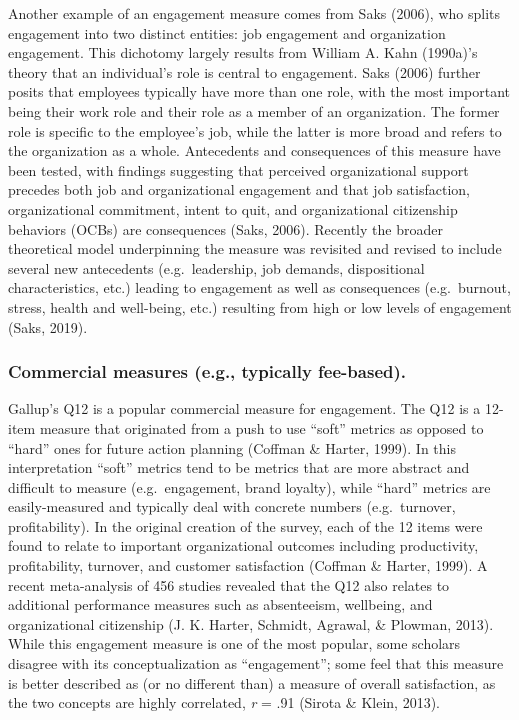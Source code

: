 \documentclass[
  man]{apa6}
\begin{document}
Another example of an engagement measure comes from Saks (2006), who splits engagement into two distinct entities: job engagement and organization engagement. This dichotomy largely results from William A. Kahn (1990a)'s theory that an individual's role is central to engagement. Saks (2006) further posits that employees typically have more than one role, with the most important being their work role and their role as a member of an organization. The former role is specific to the employee's job, while the latter is more broad and refers to the organization as a whole. Antecedents and consequences of this measure have been tested, with findings suggesting that perceived organizational support precedes both job and organizational engagement and that job satisfaction, organizational commitment, intent to quit, and organizational citizenship behaviors (OCBs) are consequences (Saks, 2006). Recently the broader theoretical model underpinning the measure was revisited and revised to include several new antecedents (e.g.~leadership, job demands, dispositional characteristics, etc.) leading to engagement as well as consequences (e.g.~burnout, stress, health and well-being, etc.) resulting from high or low levels of engagement (Saks, 2019).

\hypertarget{commercial-measures-e.g.-typically-fee-based.}{%
\subsubsection{Commercial measures (e.g., typically fee-based).}\label{commercial-measures-e.g.-typically-fee-based.}}

Gallup's Q12 is a popular commercial measure for engagement. The Q12 is a 12-item measure that originated from a push to use ``soft'' metrics as opposed to ``hard'' ones for future action planning (Coffman \& Harter, 1999). In this interpretation ``soft'' metrics tend to be metrics that are more abstract and difficult to measure (e.g.~engagement, brand loyalty), while ``hard'' metrics are easily-measured and typically deal with concrete numbers (e.g.~turnover, profitability). In the original creation of the survey, each of the 12 items were found to relate to important organizational outcomes including productivity, profitability, turnover, and customer satisfaction (Coffman \& Harter, 1999). A recent meta-analysis of 456 studies revealed that the Q12 also relates to additional performance measures such as absenteeism, wellbeing, and organizational citizenship (J. K. Harter, Schmidt, Agrawal, \& Plowman, 2013). While this engagement measure is one of the most popular, some scholars disagree with its conceptualization as ``engagement''; some feel that this measure is better described as (or no different than) a measure of overall satisfaction, as the two concepts are highly correlated, \emph{r} = .91 (Sirota \& Klein, 2013).
\end{document}

